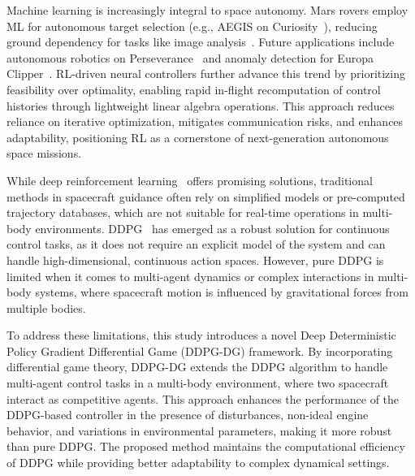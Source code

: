 \documentclass[conference]{IEEEtran}
\begin{document}
Machine learning is increasingly integral to space autonomy. Mars rovers employ ML for autonomous target selection (e.g., AEGIS on Curiosity~\cite{17}), reducing ground dependency for tasks like image analysis~\cite{18}. Future applications include autonomous robotics on Perseverance~\cite{19,20} and anomaly detection for Europa Clipper~\cite{Clipper}. RL-driven neural controllers further advance this trend by prioritizing feasibility over optimality, enabling rapid in-flight recomputation of control histories through lightweight linear algebra operations. This approach reduces reliance on iterative optimization, mitigates communication risks, and enhances adaptability, positioning RL as a cornerstone of next-generation autonomous space missions.

While deep reinforcement learning~\cite{newrl} offers promising solutions, traditional methods in spacecraft guidance often rely on simplified models or pre-computed trajectory databases, which are not suitable for real-time operations in multi-body environments. DDPG~\cite{DDPG} has emerged as a robust solution for continuous control tasks, as it does not require an explicit model of the system and can handle high-dimensional, continuous action spaces. However, pure DDPG is limited when it comes to multi-agent dynamics or complex interactions in multi-body systems, where spacecraft motion is influenced by gravitational forces from multiple bodies.

To address these limitations, this study introduces a novel Deep Deterministic Policy Gradient Differential Game (DDPG-DG) framework. By incorporating differential game theory, DDPG-DG extends the DDPG algorithm to handle multi-agent control tasks in a multi-body environment, where two spacecraft interact as competitive agents. This approach enhances the performance of the DDPG-based controller in the presence of disturbances, non-ideal engine behavior, and variations in environmental parameters, making it more robust than pure DDPG. The proposed method maintains the computational efficiency of DDPG while providing better adaptability to complex dynamical settings.
\end{document}
